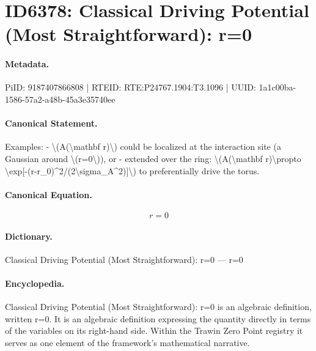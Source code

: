\section*{ID6378: Classical Driving Potential (Most Straightforward): r=0}
\paragraph{Metadata.}
PiID: 9187407866808 | RTEID: RTE:P24767.1904:T3.1096 | UUID: 1a1c00ba-1586-57a2-a48b-45a3e35740ee

\paragraph{Canonical Statement.}
Examples: - \textbackslash{}(A(\textbackslash{}mathbf r)\textbackslash{}) could be localized at the interaction site (a Gaussian around \textbackslash{}(r=0\textbackslash{})), or - extended over the ring: \textbackslash{}(A(\textbackslash{}mathbf r)\textbackslash{}propto \textbackslash{}exp[-(r-r\_0)\textasciicircum{}2/(2\textbackslash{}sigma\_A\textasciicircum{}2)]\textbackslash{}) to preferentially drive the torus.

\paragraph{Canonical Equation.}
\[
r=0
\]

\paragraph{Dictionary.}
Classical Driving Potential (Most Straightforward): r=0 — r=0

\paragraph{Encyclopedia.}
Classical Driving Potential (Most Straightforward): r=0 is an algebraic definition, written r=0. It is an algebraic definition expressing the quantity directly in terms of the variables on its right-hand side. Within the Trawin Zero Point registry it serves as one element of the framework's mathematical narrative.
